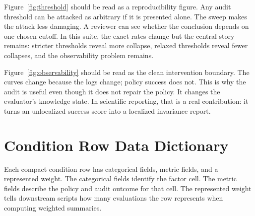 \documentclass{article}
\begin{document}
Figure~\ref{fig:threshold} should be read as a reproducibility figure. Any audit threshold can be attacked as arbitrary if it is presented alone. The sweep makes the attack less damaging. A reviewer can see whether the conclusion depends on one chosen cutoff. In this suite, the exact rates change but the central story remains: stricter thresholds reveal more collapse, relaxed thresholds reveal fewer collapses, and the observability problem remains.

Figure~\ref{fig:observability} should be read as the clean intervention boundary. The curves change because the logs change; policy success does not. This is why the audit is useful even though it does not repair the policy. It changes the evaluator's knowledge state. In scientific reporting, that is a real contribution: it turns an unlocalized success score into a localized invariance report.

\section{Condition Row Data Dictionary}

Each compact condition row has categorical fields, metric fields, and a represented weight. The categorical fields identify the factor cell. The metric fields describe the policy and audit outcome for that cell. The represented weight tells downstream scripts how many evaluations the row represents when computing weighted summaries.
\end{document}

